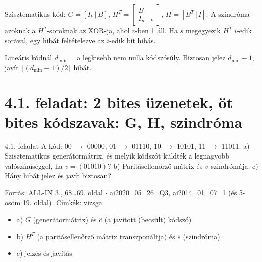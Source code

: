 Szisztematikus kód: $G=[I_k\,|\,B]$, $H^T=\begin{bmatrix}B\\I_{n-k}\end{bmatrix}$, $H=[B^T\,|\,I]$. A szindróma azoknak a $H^T$-soroknak az XOR-ja, ahol $v$-ben 1 áll. Ha $s$ megegyezik $H^T$ $i$-edik sorával, egy hibát feltételezve az $i$-edik bit hibás.

Lineáris kódnál $d_{\min}$ = a legkisebb nem nulla kódszósúly. Biztosan jelez $d_{\min}-1$, javít $\lfloor(d_{\min}-1)/2\rfloor$ hibát.

\section{\texorpdfstring{4.1. feladat: 2 bites üzenetek, öt bites kódszavak: G, H, szindróma}{4.1. feladat: 2 bites üzenetek, öt bites kódszavak: G, H, szindróma}}\label{ai4_01}
\setcounter{lepes}{0}
\begin{feladat}{4.1. feladat}
A kód: 00 $\to$ 00000, 01 $\to$ 01110, 10 $\to$ 10101, 11 $\to$ 11011. a) Szisztematikus generátormátrix, és melyik kódszót küldték a legnagyobb valószínűséggel, ha $v=(01010)$? b) Paritásellenőrző mátrix és $v$ szindrómája. c) Hány hibát jelez és javít biztosan?

{\footnotesize\sffamily Forrás: ALL-IN 3., 68\ldots{}69. oldal $\cdot$ ai2020\_05\_26\_Q3, ai2014\_01\_07\_1 (és 5-ösöm 19. oldal). Címkék: vizsga}
\end{feladat}
\begin{keresunk}
\begin{itemize}
\item a) $G$ (generátormátrix) és $\hat c$ (a javított (becsült) kódszó)
\item b) $H^T$ (a paritásellenőrző mátrix transzponáltja) és $s$ (szindróma)
\item c) jelzés és javítás
\end{itemize}
\end{keresunk}

